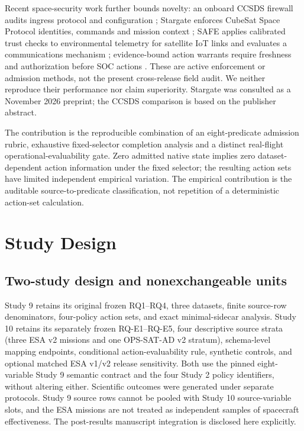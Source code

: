 \documentclass[preprint,12pt]{elsarticle}
\begin{document}
Recent space-security work further bounds novelty: an onboard CCSDS firewall audits ingress protocol and configuration \cite{im2026ccsds}; Stargate enforces CubeSat Space Protocol identities, commands and mission context \cite{ramsey2026stargate}; SAFE applies calibrated trust checks to environmental telemetry for satellite IoT links and evaluates a communications mechanism \cite{qasim2026safe}; evidence-bound action warrants require freshness and authorization before SOC actions \cite{torstensson2026warrants}. These are active enforcement or admission methods, not the present cross-release field audit. We neither reproduce their performance nor claim superiority. Stargate was consulted as a November 2026 preprint; the CCSDS comparison is based on the publisher abstract.

The contribution is the reproducible combination of an eight-predicate admission rubric, exhaustive fixed-selector completion analysis and a distinct real-flight operational-evaluability gate. Zero admitted native state implies zero dataset-dependent action information under the fixed selector; the resulting action sets have limited independent empirical variation. The empirical contribution is the auditable source-to-predicate classification, not repetition of a deterministic action-set calculation.

\section{Study Design}

\subsection{Two-study design and nonexchangeable units}
Study 9 retains its original frozen RQ1--RQ4, three datasets, finite source-row denominators, four-policy action sets, and exact minimal-sidecar analysis. Study 10 retains its separately frozen RQ-E1--RQ-E5, four descriptive source strata (three ESA v2 missions and one OPS-SAT-AD v2 stratum), schema-level mapping endpoints, conditional action-evaluability rule, synthetic controls, and optional matched ESA v1/v2 release sensitivity. Both use the pinned eight-variable Study 9 semantic contract and the four Study 2 policy identifiers, without altering either. Scientific outcomes were generated under separate protocols. Study 9 source rows cannot be pooled with Study 10 source-variable slots, and the ESA missions are not treated as independent samples of spacecraft effectiveness. The post-results manuscript integration is disclosed here explicitly.
\end{document}
